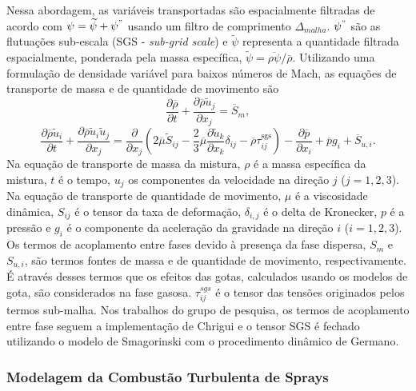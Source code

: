 Nessa abordagem, as variáveis transportadas são espacialmente filtradas de acordo com $\psi = \widetilde\psi + \psi^"$ usando um filtro de comprimento $\Delta_{malha}$. $\psi^"$ são as flutuações sub-escala (SGS - \emph{sub-grid scale}) e $\widetilde\psi$ representa a quantidade filtrada espacialmente, ponderada pela massa específica, $\widetilde\psi = \overline{\rho\psi}/\overline\rho$.
Utilizando uma formulação de densidade variável para baixos números de Mach, as equações de transporte de massa e de quantidade de movimento são
\begin{equation}
    \frac{\partial \overline \rho}{\partial t} + 
    \frac{\partial \overline \rho \widetilde u_j}{\partial x_j} = 
    \overline S_m,
\end{equation}
\begin{equation}
    \frac{\partial \overline\rho \widetilde u_i}{\partial t} + 
    \frac{\partial \overline\rho \widetilde u_i \widetilde u_j}{\partial x_j} =
    \frac{\partial }{\partial x_j} \left(
        2\overline\mu \widetilde S_{ij} -
        \frac{2}{3}\overline\mu \frac{\partial \widetilde u_k}{\partial x_k} \delta_{ij} -
        \overline\rho \tau_{ij}^{\text{sgs}}
    \right) -
    \frac{\partial \overline p}{\partial x_i} +
    \overline p g_i + 
    \overline S_{u,i}.
\end{equation}
Na equação de transporte de massa da mistura, $\rho$ é a massa específica da mistura, $t$ é o tempo, $u_j$ os componentes da velocidade na direção $j$ ($j=1,2,3$).
Na equação de transporte de quantidade de movimento, $\mu$ é a viscosidade dinâmica, $S_{ij}$ é o tensor da taxa de deformação, $\delta_{i,j}$ é o delta de Kronecker, $p$ é a pressão e $g_i$ é o componente da aceleração da gravidade na direção	$i$ ($i=1,2,3$). 
Os termos de acoplamento entre fases devido à presença da fase dispersa, $S_m$ e $S_{u,i}$,  são termos fontes de massa e de quantidade de movimento, respectivamente.
É através desses termos que os efeitos das gotas, calculados usando os modelos de gota, são considerados na fase gasosa.
$\tau_{ij}^{sgs}$ é o tensor das tensões originados pelos termos sub-malha.
Nos trabalhos do grupo de pesquisa, os termos de acoplamento entre fase seguem a implementação de Chrigui\etal{} \cite{ChriguiM2012} e o tensor SGS é fechado utilizando o modelo de Smagorinski \cite{Pope2000} com o procedimento dinâmico de Germano\etal \cite{Germano1991}.

\subsubsection{Modelagem da Combustão Turbulenta de Sprays} \label{sec:comb-sprays}

